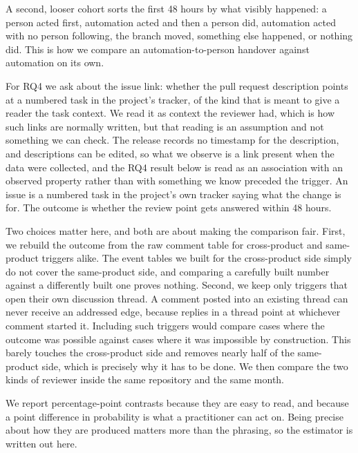 \documentclass[lineno,pdflatex,sn-basic]{sn-jnl}
\begin{document}
A second, looser cohort sorts the first 48 hours by what visibly happened: a
person acted first, automation acted and then a person did, automation acted with
no person following, the branch moved, something else happened, or nothing did.
This is how we compare an automation-to-person handover against automation on its
own.

For RQ4 we ask about the issue link: whether the pull request description points
at a numbered task in the project's tracker, of the kind that is meant to give a
reader the task context. We read it as context the reviewer had, which is how
such links are normally written, but that reading is an assumption and not
something we can check. The release records no timestamp for the
description, and descriptions can be edited, so what we observe is a link present
when the data were collected, and the RQ4 result below is read as an association
with an observed property rather than with something we know preceded the
trigger. An issue is a numbered task in the project's own
tracker saying what the change is for. The outcome is whether the review point gets answered
within 48 hours.

Two choices matter here, and both are about making the comparison fair. First, we
rebuild the outcome from the raw comment table for cross-product and same-product
triggers alike. The event tables we built for the cross-product side simply do not
cover the same-product side, and comparing a carefully built number against a
differently built one proves nothing. Second, we keep only triggers that open
their own discussion thread. A comment posted into an existing thread can never
receive an addressed edge, because replies in a thread point at whichever comment
started it. Including such triggers would compare cases where the outcome was
possible against cases where it was impossible by construction. This barely
touches the cross-product side and removes nearly half of the same-product side,
which is precisely why it has to be done. We then compare the two kinds of
reviewer inside the same repository and the same month.

We report percentage-point contrasts because they are easy to read, and because a
point difference in probability is what a practitioner can act on. Being precise
about how they are produced matters more than the phrasing, so the estimator is
written out here.
\end{document}
